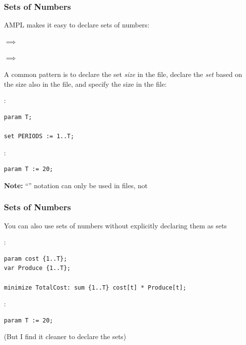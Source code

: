 \begin{frame}[fragile]

	\frametitle{Sets of Numbers}
	
	\bit
	\item AMPL makes it easy to declare sets of numbers:
		\bit
		\item {} $\implies$ 
		\item {} $\implies$ 
		\eit
	\item A common pattern is to declare the set {\em size} in the  file, declare the {\em set} based on the size also in the  file, and specify the size in the  file:
	\eit

:	
\begin{lstlisting}
param T;

set PERIODS := 1..T;
\end{lstlisting}

:	
\begin{lstlisting}
param T := 20;
\end{lstlisting}

	\bit
	\item {\bf Note:} ``'' notation can only be used in  files, not 
	\eit
	
\end{frame}

\begin{frame}[fragile]

	\frametitle{Sets of Numbers}
	
	\bit
	\item You can also use sets of numbers without explicitly declaring them as sets
	\eit

:	
\begin{lstlisting}
param cost {1..T};
var Produce {1..T};

minimize TotalCost: sum {1..T} cost[t] * Produce[t];
\end{lstlisting}

:	
\begin{lstlisting}
param T := 20;
\end{lstlisting}

	\bit
	\item (But I find it cleaner to declare the sets)
	\eit
	
\end{frame}


